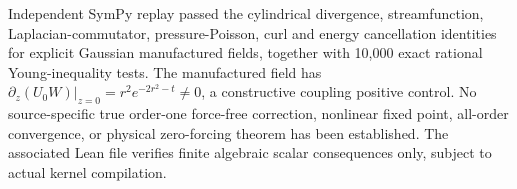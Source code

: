 Independent SymPy replay passed the cylindrical divergence,
streamfunction, Laplacian-commutator, pressure-Poisson, curl
and energy cancellation identities for explicit Gaussian manufactured
fields, together with 10,000 exact rational Young-inequality tests.
The manufactured field has $\partial_z(U_0W)|_{z=0}
=r^2e^{-2r^2-t}\ne0$, a constructive coupling positive control.
No source-specific true order-one force-free correction,
nonlinear fixed point, all-order convergence, or physical
zero-forcing theorem has been established.
The associated Lean file verifies finite algebraic scalar
consequences only, subject to actual kernel compilation.